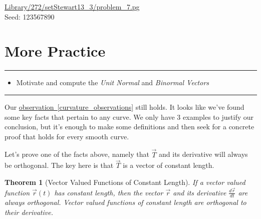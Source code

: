 \documentclass[10pt,]{book}
\theoremstyle{plain}
\newtheorem{theorem}{Theorem}[section]
\theoremstyle{definition}
\theoremstyle{definition}
\theoremstyle{definition}
\theoremstyle{definition}
\newenvironment{objectives}[1]{\noindent\rule{\linewidth}{0.1ex}\newline{\textbf{{\large#1}}\par\smallskip}}{\par\noindent\rule{\linewidth}{0.1ex}\par\smallskip}
\theoremstyle{definition}
\numberwithin{equation}{section}
\newcommand{\ds}{\displaystyle}
\begin{document}
\begin{exerciselist}
\begin{mdframed}
{}\par\vspace*{2ex}%
{\tiny\ttfamily\noindent\url{Library/272/setStewart13_3/problem_7.pg}\\Seed: 123567890\hfill}\end{mdframed}
\end{exerciselist}
\typeout{************************************************}
\typeout{************************************************}
\section[{More Practice}]{More Practice}\label{ch08_04_unitnormal}
\begin{objectives}{Objectives}\label{objectives-19}
%
\begin{itemize}[label=\textbullet]
\item{}Motivate and compute the \emph{Unit Normal} and \emph{Binormal Vectors}%
\end{itemize}
\end{objectives}
Our \hyperref[curvature_observations]{observation~\ref{curvature_observations}} still holds. It looks like we've found some key facts that pertain to any curve. We only have 3 examples to justify our conclusion, but it's enough to make some definitions and then seek for a concrete proof that holds for every smooth curve.%
\par
Let's prove one of the facts above, namely that \(\vec T\) and its derivative will always be orthogonal. The key here is that \(\vec T\) is a vector of constant length.%
\begin{theorem}[{Vector Valued Functions of Constant Length}]\label{vector_valued_functions_of_constant_length}
If a vector valued function \(\vec r(t)\) has constant length, then the vector \(\vec r\) and its derivative \(\ds\frac{d\vec r}{dt}\) are always orthogonal. Vector valued functions of constant length are orthogonal to their derivative.%
\end{theorem}
\end{document}
